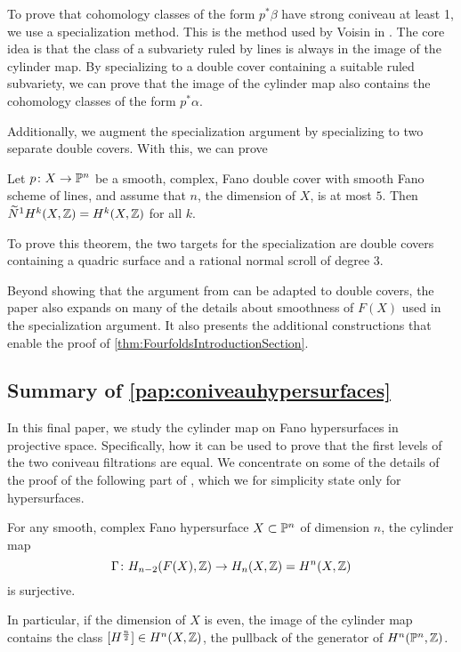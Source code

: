 To prove that cohomology classes of the form $p^*\beta$ have strong coniveau at least 1, we use a specialization method. This is the method used by Voisin in \cite{VoisinConiveauThreefolds}. The core idea is that the class of a subvariety ruled by lines is always in the image of the cylinder map. By specializing to a double cover containing a suitable ruled subvariety, we can prove that the image of the cylinder map also contains the cohomology classes of the form $p^*\alpha$. 

Additionally, we augment the specialization argument by specializing to two separate double covers. With this, we can prove
\begin{theorem}
	\label{thm:FourfoldsIntroductionSection}
	Let $p \from X \to \P^n$ be a smooth, complex, Fano double cover with smooth Fano scheme of lines, and assume that $n$, the dimension of $X$, is at most $5$. Then $\widetilde{N}^1H^k(X,\Z) = H^k(X,\Z)$ for all $k$.
\end{theorem}
To prove this theorem, the two targets for the specialization are double covers containing a quadric surface and a rational normal scroll of degree 3.

Beyond showing that the argument from \cite{VoisinConiveauThreefolds} can be adapted to double covers, the paper also expands on many of the details about smoothness of $F(X)$ used in the specialization argument. It also presents the additional constructions that enable the proof of \cref{thm:FourfoldsIntroductionSection}.

\subsection{Summary of \cref{pap:coniveauhypersurfaces}}
In this final paper, we study the cylinder map on Fano hypersurfaces in projective space. Specifically, how it can be used to prove that the first levels of the two coniveau filtrations are equal. We concentrate on some 
of the details of the proof of the following part of \cite[Theorem 1.13]{VoisinConiveauThreefolds}, which we for simplicity state only for hypersurfaces.
\begin{theorem}
	\label{thm:VoisinConiveauIntroductionSection}
	For any smooth, complex Fano hypersurface  $X \subset \P^n$ of dimension $n$, the cylinder map 
	\[\Gamma \from H_{n-2}(F(X),\Z) \to H_n(X,\Z) = H^n(X,\Z) \]
	is surjective.
\end{theorem}
In particular, if the dimension of $X$ is even, the image of the cylinder map contains the class $[H^{\frac{n}{2}}] \in H^n(X,\Z)$, the pullback of the generator of $H^n(\P^n,\Z)$.

